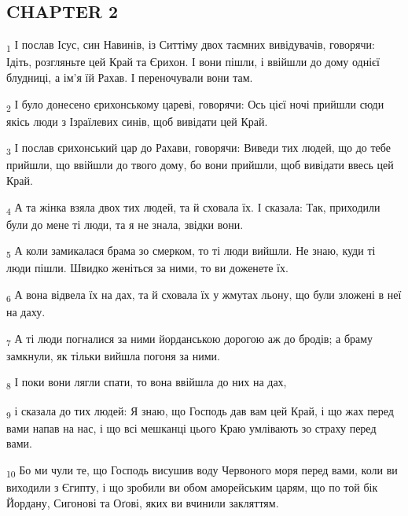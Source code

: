 \subsection{CHAPTER 2}
\begin{tcolorbox}
\textsubscript{1} І послав Ісус, син Навинів, із Ситтіму двох таємних вивідувачів, говорячи: Ідіть, розгляньте цей Край та Єрихон. І вони пішли, і ввійшли до дому однієї блудниці, а ім'я їй Рахав. І переночували вони там.
\end{tcolorbox}
\begin{tcolorbox}
\textsubscript{2} І було донесено єрихонському цареві, говорячи: Ось цієї ночі прийшли сюди якісь люди з Ізраїлевих синів, щоб вивідати цей Край.
\end{tcolorbox}
\begin{tcolorbox}
\textsubscript{3} І послав єрихонський цар до Рахави, говорячи: Виведи тих людей, що до тебе прийшли, що ввійшли до твого дому, бо вони прийшли, щоб вивідати ввесь цей Край.
\end{tcolorbox}
\begin{tcolorbox}
\textsubscript{4} А та жінка взяла двох тих людей, та й сховала їх. І сказала: Так, приходили були до мене ті люди, та я не знала, звідки вони.
\end{tcolorbox}
\begin{tcolorbox}
\textsubscript{5} А коли замикалася брама зо смерком, то ті люди вийшли. Не знаю, куди ті люди пішли. Швидко женіться за ними, то ви доженете їх.
\end{tcolorbox}
\begin{tcolorbox}
\textsubscript{6} А вона відвела їх на дах, та й сховала їх у жмутах льону, що були зложені в неї на даху.
\end{tcolorbox}
\begin{tcolorbox}
\textsubscript{7} А ті люди погналися за ними йорданською дорогою аж до бродів; а браму замкнули, як тільки вийшла погоня за ними.
\end{tcolorbox}
\begin{tcolorbox}
\textsubscript{8} І поки вони лягли спати, то вона ввійшла до них на дах,
\end{tcolorbox}
\begin{tcolorbox}
\textsubscript{9} і сказала до тих людей: Я знаю, що Господь дав вам цей Край, і що жах перед вами напав на нас, і що всі мешканці цього Краю умлівають зо страху перед вами.
\end{tcolorbox}
\begin{tcolorbox}
\textsubscript{10} Бо ми чули те, що Господь висушив воду Червоного моря перед вами, коли ви виходили з Єгипту, і що зробили ви обом аморейським царям, що по той бік Йордану, Сигонові та Оґові, яких ви вчинили закляттям.
\end{tcolorbox}
